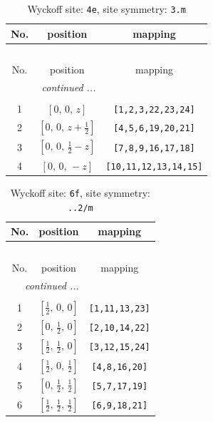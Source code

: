\documentclass[fleqn,8pt]{jsarticle}
\begin{document}
\renewcommand{\arraystretch}{1.2}
\begin{longtable}{ccc}
\caption{Wyckoff site: {\tt 4e}, site symmetry: {\tt 3.m}}
 \\
 \hline \hline
No. & position & mapping \\ \hline \endfirsthead

\multicolumn{2}{l}{\tablename\ \thetable{}} \\
 \hline \hline
No. & position & mapping \\ \hline \endhead

 \hline \hline
\multicolumn{2}{r}{\footnotesize\it continued ...} \\ \endfoot

 \hline \hline
\multicolumn{2}{r}{} \\ \endlastfoot

1 & $\left[ 0,\, 0,\, z \right]$ & {\tt [1,2,3,22,23,24]} \\ \hline
2 & $\left[ 0,\, 0,\, z + \frac{1}{2} \right]$ & {\tt [4,5,6,19,20,21]} \\ \hline
3 & $\left[ 0,\, 0,\, \frac{1}{2} - z \right]$ & {\tt [7,8,9,16,17,18]} \\ \hline
4 & $\left[ 0,\, 0,\, - z \right]$ & {\tt [10,11,12,13,14,15]} \\
\end{longtable}
\renewcommand{\arraystretch}{1.2}
\begin{longtable}{ccc}
\caption{Wyckoff site: {\tt 6f}, site symmetry: {\tt ..2/m}}
 \\
 \hline \hline
No. & position & mapping \\ \hline \endfirsthead

\multicolumn{2}{l}{\tablename\ \thetable{}} \\
 \hline \hline
No. & position & mapping \\ \hline \endhead

 \hline \hline
\multicolumn{2}{r}{\footnotesize\it continued ...} \\ \endfoot

 \hline \hline
\multicolumn{2}{r}{} \\ \endlastfoot

1 & $\left[ \frac{1}{2},\, 0,\, 0 \right]$ & {\tt [1,11,13,23]} \\ \hline
2 & $\left[ 0,\, \frac{1}{2},\, 0 \right]$ & {\tt [2,10,14,22]} \\ \hline
3 & $\left[ \frac{1}{2},\, \frac{1}{2},\, 0 \right]$ & {\tt [3,12,15,24]} \\ \hline
4 & $\left[ \frac{1}{2},\, 0,\, \frac{1}{2} \right]$ & {\tt [4,8,16,20]} \\ \hline
5 & $\left[ 0,\, \frac{1}{2},\, \frac{1}{2} \right]$ & {\tt [5,7,17,19]} \\ \hline
6 & $\left[ \frac{1}{2},\, \frac{1}{2},\, \frac{1}{2} \right]$ & {\tt [6,9,18,21]} \\
\end{longtable}
\end{document}
